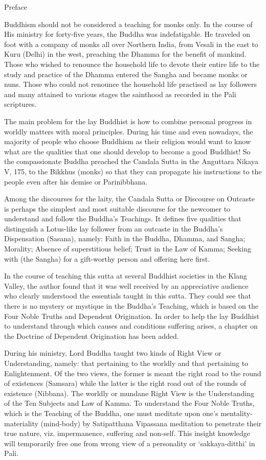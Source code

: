 Preface

Buddhism should not be considered a teaching for monks only. In the course of His ministry for forty-five years, the Buddha was indefatigable. He traveled on foot with a company of monks all over Northern India, from Vesali in the east to Kuru (Delhi) in the west, preaching the Dhamma for the benefit of mankind. Those who wished to renounce the household life to devote their entire life to the study and practice of the Dhamma entered the Sangha and became monks or nuns. Those who could not renounce the household life practised as lay followers and many attained to various stages the sainthood as recorded in the Pali scriptures.

The main problem for the lay Buddhist is how to combine personal progress in worldly matters with moral principles. During his time and even nowadays, the majority of people who choose Buddhism as their religion would want to know what are the qualities that one should develop to become a good Buddhist! So the compassionate Buddha preached the Candala Sutta in the Anguttara Nikaya V, 175, to the Bikkhus (monks) so that they can propagate his instructions to the people even after his demise or Parinibbhana.

Among the discourses for the laity, the Candala Sutta or Discourse on Outcaste is perhaps the simplest and most suitable discourse for the newcomer to understand and follow the Buddha’s Teachings. It defines five qualities that distinguish a Lotus-like lay follower from an outcaste in the Buddha’s Dispensation (Sasana), namely: Faith in the Buddha, Dhamma, and Sangha; Morality; Absence of superstitious belief; Trust in the Law of Kamma; Seeking with (the Sangha) for a gift-worthy person and offering here first.

In the course of teaching this sutta at several Buddhist societies in the Klang Valley, the author found that it was well received by an appreciative audience who clearly understood the essentials taught in this sutta. They could see that there is no mystery or mystique in the Buddha’s Teaching, which is based on the Four Noble Truths and Dependent Origination. In order to help the lay Buddhist to understand through which causes and conditions suffering arises, a chapter on the Doctrine of Dependent Origination has been added.

During his ministry, Lord Buddha taught two kinds of Right View or Understanding, namely: that pertaining to the worldly and that pertaining to Enlightenment. Of the two views, the former is meant the right road to the round of existences (Samsara) while the latter is the right road out of the rounds of existence (Nibbana). The worldly or mundane Right View is the Understanding of the Ten Subjects and Law of Kamma. To understand the Four Noble Truths, which is the Teaching of the Buddha, one must meditate upon one’s mentality-materiality (mind-body) by Satipatthana Vipassana meditation to penetrate their true nature, viz. impermanence, suffering and non-self. This insight knowledge will temporarily free one from wrong view of a personality or ‘sakkaya-ditthi’ in Pali.

